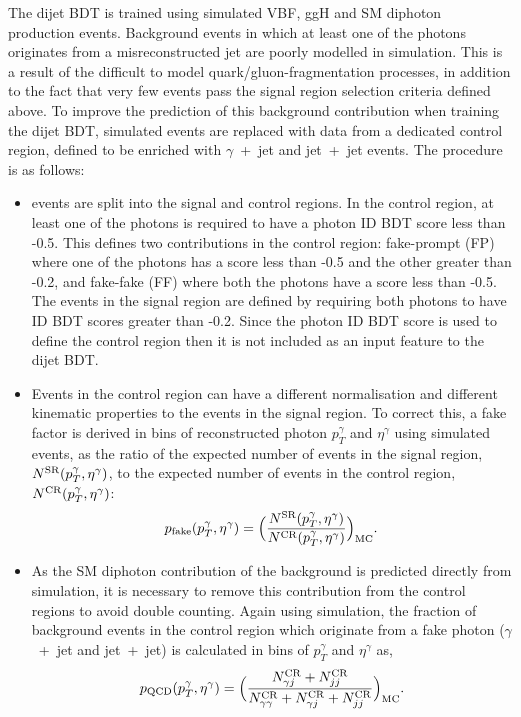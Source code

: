 The dijet BDT is trained using simulated VBF, ggH and SM diphoton production events. Background events in which at least one of the photons originates from a misreconstructed jet are poorly modelled in simulation. This is a result of the difficult to model quark/gluon-fragmentation processes, in addition to the fact that very few events pass the signal region selection criteria defined above. To improve the prediction of this background contribution when training the dijet BDT, simulated events are replaced with data from a dedicated control region, defined to be enriched with $\gamma$~+~jet and jet~+~jet events. The procedure is as follows:

\begin{itemize}
    \item events are split into the signal and control regions. In the control region, at least one of the photons is required to have a photon ID BDT score less than -0.5. This defines two contributions in the control region: fake-prompt (FP) where one of the photons has a score less than -0.5 and the other greater than -0.2, and fake-fake (FF) where both the photons have a score less than -0.5. The events in the signal region are defined by requiring both photons to have ID BDT scores greater than -0.2. Since the photon ID BDT score is used to define the control region then it is not included as an input feature to the dijet BDT.
    
    \item Events in the control region can have a different normalisation and different kinematic properties to the events in the signal region. To correct this, a fake factor is derived in bins of reconstructed photon $p_T^\gamma$ and $\eta^\gamma$ using simulated events, as the ratio of the expected number of events in the signal region, $N^{\rm{SR}}(p_T^\gamma,\eta^\gamma)$, to the expected number of events in the control region, $N^{\rm{CR}}(p_T^\gamma,\eta^\gamma)$:
    \begin{equation}
        p_{\rm{fake}}(p_T^\gamma,\eta^\gamma) = \Big(\frac{N^{\rm{SR}}(p_T^\gamma,\eta^\gamma)}{N^{\rm{CR}}(p_T^\gamma,\eta^\gamma)}\Big)_{\rm{MC}}.
    \end{equation}
    
    \item As the SM diphoton contribution of the background is predicted directly from simulation, it is necessary to remove this contribution from the control regions to avoid double counting. Again using simulation, the fraction of background events in the control region which originate from a fake photon ($\gamma$~+~jet and jet~+~jet) is calculated in bins of $p_T^{\gamma}$ and $\eta^\gamma$ as,
    \begin{equation}
        p_{\rm{QCD}}(p_T^\gamma,\eta^\gamma) = \Big(\frac{N_{\gamma j}^{\rm{CR}}+N_{jj}^{\rm{CR}}}{N_{\gamma\gamma}^{\rm{CR}}+N_{\gamma j}^{\rm{CR}}+N_{jj}^{\rm{CR}}}\Big)_{\rm{MC}}.
    \end{equation}    
    

\end{itemize}
